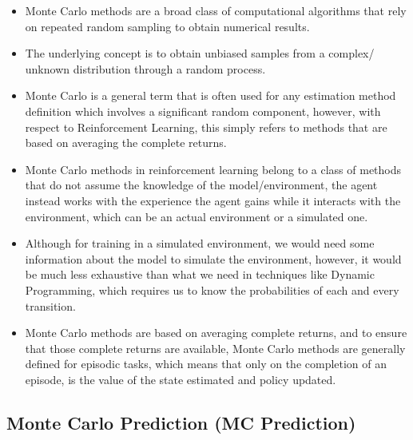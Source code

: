 \begin{itemize}
    \item Monte Carlo methods are a broad class of computational algorithms that rely on repeated random sampling to obtain numerical results.

    \item The underlying concept is to obtain unbiased samples from a complex/ unknown distribution through a random process.

    \item Monte Carlo is a general term that is often used for any estimation method definition which involves a significant random component, however, with respect to Reinforcement Learning, this simply refers to methods that are based on averaging the complete returns. \cite{medium/nerd-for-tech/monte-carlo-methods-for-reinforcement-learning-d30d874dd817}

    \item Monte Carlo methods in reinforcement learning belong to a class of methods that do not assume the knowledge of the model/environment, the agent instead works with the experience the agent gains while it interacts with the environment, which can be an actual environment or a simulated one. \cite{medium/nerd-for-tech/monte-carlo-methods-for-reinforcement-learning-d30d874dd817}
    
    \item Although for training in a simulated environment, we would need some information about the model to simulate the environment, however, it would be much less exhaustive than what we need in techniques like Dynamic Programming, which requires us to know the probabilities of each and every transition. \cite{medium/nerd-for-tech/monte-carlo-methods-for-reinforcement-learning-d30d874dd817}

    \item Monte Carlo methods are based on averaging complete returns, and to ensure that those complete returns are available, Monte Carlo methods are generally defined for episodic tasks, which means that only on the completion of an episode, is the value of the state estimated and policy updated. \cite{medium/nerd-for-tech/monte-carlo-methods-for-reinforcement-learning-d30d874dd817}

\end{itemize}

\subsection{Monte Carlo Prediction (MC Prediction) \cite{medium/nerd-for-tech/monte-carlo-methods-for-reinforcement-learning-d30d874dd817}} \label{Monte Carlo Prediction}

